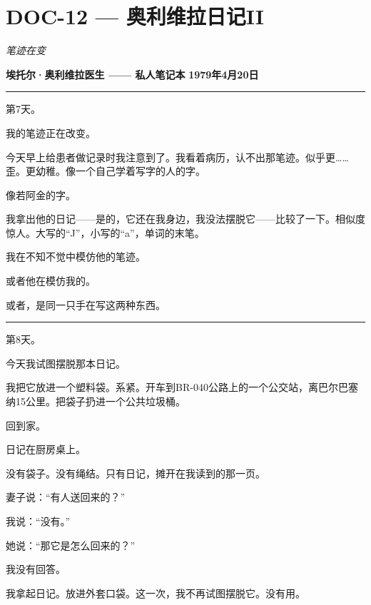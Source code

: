 \section*{\textbf{DOC-12} --- 奥利维拉日记II}

\noindent \textit{笔迹在变}

\noindent \textbf{埃托尔·奥利维拉医生 —— 私人笔记本}
\textbf{1979年4月20日}

\vspace{0.5em}\noindent\rule{\textwidth}{0.5pt}\vspace{0.5em}

\noindent 第7天。

\noindent 我的笔迹正在改变。

\noindent 今天早上给患者做记录时我注意到了。我看着病历，认不出那笔迹。似乎更……歪。更幼稚。像一个自己学着写字的人的字。

\noindent 像若阿金的字。

\noindent 我拿出他的日记——是的，它还在我身边，我没法摆脱它——比较了一下。相似度惊人。大写的“J”，小写的“a”，单词的末笔。

\noindent 我在不知不觉中模仿他的笔迹。

\noindent 或者他在模仿我的。

\noindent 或者，是同一只手在写这两种东西。

\vspace{0.5em}\noindent\rule{\textwidth}{0.5pt}\vspace{0.5em}

\noindent 第8天。

\noindent 今天我试图摆脱那本日记。

\noindent 我把它放进一个塑料袋。系紧。开车到BR-040公路上的一个公交站，离巴尔巴塞纳15公里。把袋子扔进一个公共垃圾桶。

\noindent 回到家。

\noindent 日记在厨房桌上。

\noindent 没有袋子。没有绳结。只有日记，摊开在我读到的那一页。

\noindent 妻子说：“有人送回来的？”

\noindent 我说：“没有。”

\noindent 她说：“那它是怎么回来的？”

\noindent 我没有回答。

\noindent 我拿起日记。放进外套口袋。这一次，我不再试图摆脱它。没有用。

